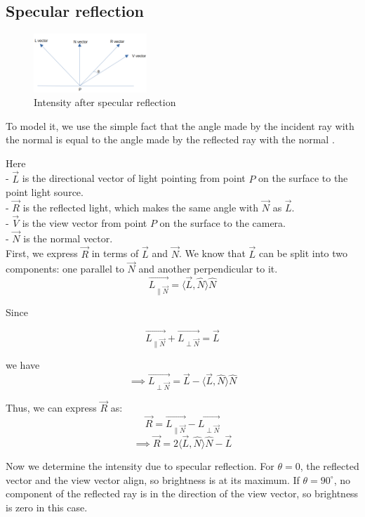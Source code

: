 \documentclass[conference]{IEEEtran}
\begin{document}
\subsection{Specular reflection}

\begin{figure}[htbp]
    \centerline{\includegraphics[width=0.38\textwidth]{./figs/intensityspecular.png}}
    \caption{Intensity after specular reflection}

\end{figure}
To model it, we use the simple fact that the angle made by the incident ray with the normal is equal to the angle made by the reflected ray with the normal .

Here\\
- $\vec{L}$ is the directional vector of light pointing from point $P$ on the surface to the point light source.\\
- $\vec{R}$ is the reflected light, which makes the same angle with $\vec{N}$ as $\vec{L}$.\\
- $\vec{V}$ is the view vector from point $P$ on the surface to the camera.\\
- $\vec{N}$ is the normal vector.\\

First, we express $\vec{R}$ in terms of $\vec{L}$ and $\vec{N}$.
We know that $\vec{L}$ can be split into two components: one parallel to $\vec{N}$ and another perpendicular to it.
$$\vec{L_{\| \vec{N}}} = \langle \vec{L}, \hat{N} \rangle \hat{N}$$

Since 

$$\vec{L_{\| \vec{N}}} + \vec{L_{\perp \vec{N}}} = \vec{L}$$

we have
$$\implies \vec{L_{\perp \vec{N}}} = \vec{L} - \langle \vec{L}, \hat{N} \rangle \hat{N}$$

Thus, we can express $\vec{R}$ as:
$$\vec{R} = \vec{L_{\| \vec{N}}} - \vec{L_{\perp \vec{N}}}$$
$$\implies \vec{R} = 2 \langle \vec{L}, \hat{N} \rangle \hat{N} - \vec{L}$$

Now we determine the intensity due to specular reflection. For $\theta = 0$, the reflected vector and the view vector align, so brightness is at its maximum. If $\theta = 90^\circ$, no component of the reflected ray is in the direction of the view vector, so brightness is zero in this case.
\end{document}
